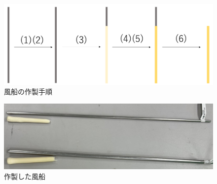 \begin{figure}[!h]
  \centering  %
  \includegraphics[scale=0.35]{pic/tezyun.PNG}
  \caption{風船の作製手順}
  \label{fig:4}
\end{figure}
\begin{figure}[!t]
  \centering  %
  \includegraphics[scale=0.28]{pic/balloon.jpg}
  \caption{作製した風船}
  \label{fig:5}
\end{figure}
